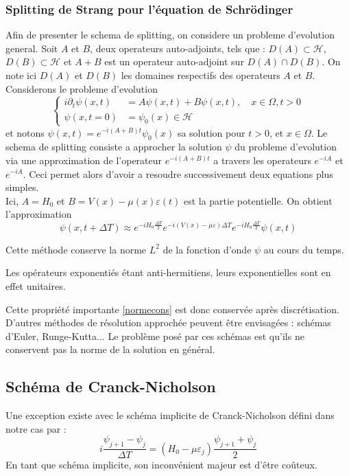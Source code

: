 \subsubsection{Splitting de Strang pour l'équation de Schrödinger}
Afin de presenter le schema de splitting, on considere un probleme d'evolution general. Soit $A$ et $B$, deux operateurs auto-adjoints, tels que : $D(A) \subset \mathcal{H}$, $D(B) \subset \mathcal{H}$ et $A+B$ est un operateur auto-adjoint sur $D(A) \cap D(B)$. On note ici $D(A)$ et $D(B)$ les domaines respectifs des operateurs $A$ et $B$. Considerons le probleme d'evolution
\begin{equation}
\begin{cases}
i \partial_t \psi (x,t) &= A\psi (x,t)+B\psi (x,t), \quad x \in \Omega, t>0 \\
\psi (x,t=0) &= \psi_0(x) \in \mathcal{H}
\end{cases}
\end{equation}
et notons $\psi(x,t)=e^{-i(A+B)t}\psi_0(x)$ sa solution pour $t>0$, et $x\in \Omega$. Le schema de splitting consiste a approcher la solution $\psi$ du probleme d'evolution via une approximation de l'operateur $e^{-i(A+B)t}$ a travers les operateurs $e^{-iA}$ et $e^{-iA}$. Ceci permet alors d'avoir a resoudre successivement deux equations plus simples. 
\\Ici, $A=H_0$ et $B=V(x)-\mu(x)\varepsilon(t)$ est la partie potentielle. On obtient l'approximation
\begin{equation}
\psi(x,t+\Delta T) \approx e^{-iH_0 \frac{\Delta T}{2}}e^{-i(V(x)-\mu\varepsilon)\Delta T}e^{-iH_0 \frac{\Delta T}{2}} \psi(x,t)
\end{equation}
\begin{pro}
	Cette méthode conserve la norme $L^2$ de la fonction d’onde $\psi$ au cours du temps.
\end{pro}
\begin{ proof }
	Les opérateurs exponentiés étant anti-hermitiens, leurs exponentielles sont en effet unitaires.
\end{ proof }
Cette propriété importante \eqref{normecons} est donc conservée après discrétisation.\\
D’autres méthodes de résolution approchée peuvent être envisagées : schémas d’Euler, Runge-Kutta... Le problème posé par ces schémas est qu’ils ne conservent pas la norme de la solution en général.
\subsection{Schéma de Cranck-Nicholson}
Une exception existe avec le schéma implicite de Cranck-Nicholson défini dans notre cas par :
\begin{equation}
i\dfrac{\psi_{j+1}-\psi_j}{\Delta T}=(H_0-\mu\varepsilon_j)\dfrac{\psi_{j+1}+\psi_j}{2}
\end{equation}
En tant que schéma implicite, son inconvénient majeur est d’être coûteux.